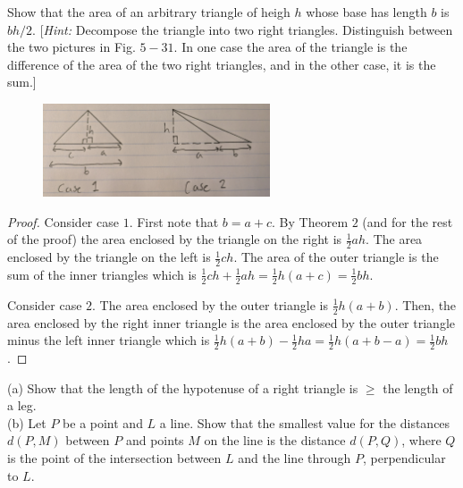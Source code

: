 \begin{tcolorbox}[title=Problem 11, breakable]
    Show that the area of an arbitrary triangle of heigh $h$ whose base has length $b$
    is $bh/2$. [\emph{Hint:} Decompose the triangle into two right triangles. Distinguish
    between the two pictures in Fig. $5-31$. In one case the area of the triangle is the difference
    of the area of the two right triangles, and in the other case, it is the sum.]
\end{tcolorbox}

\begin{figure}[h]
    \centering
    \includegraphics[width=0.6\textwidth]{images/5_5.jpg}
\end{figure}

\begin{proof}
    Consider case $1$. First note that $b = a + c$.
    By Theorem $2$ (and for the rest of the proof) the area enclosed by the triangle on the right is $\frac{1}{2}ah$.
    The area enclosed by the triangle on the left is $\frac{1}{2}ch$.
    The area of the outer triangle is the sum of the inner triangles
        which is $\frac{1}{2}ch + \frac{1}{2}ah = \frac{1}{2}h(a + c) = \frac{1}{2}bh$.

    Consider case $2$. The area enclosed by the outer triangle is $\frac{1}{2}h(a + b)$.
    Then, the area enclosed by the right inner triangle is the area enclosed 
        by the outer triangle minus the left inner triangle which is 
            $\frac{1}{2}h(a + b) - \frac{1}{2}ha = \frac{1}{2}h(a + b - a) = \frac{1}{2}bh$.
\end{proof}

\begin{tcolorbox}[title=Problem 12, breakable]
    (a) Show that the length of the hypotenuse of a right triangle is $\ge$ the length 
        of a leg. \\

    (b) Let $P$ be a point and $L$ a line. Show that the smallest value for the distances 
        $d(P, M)$ between $P$ and points $M$ on the line is the distance $d(P, Q)$,
        where $Q$ is the point of the intersection between $L$ and the line through $P$,
        perpendicular to $L$.
\end{tcolorbox}

